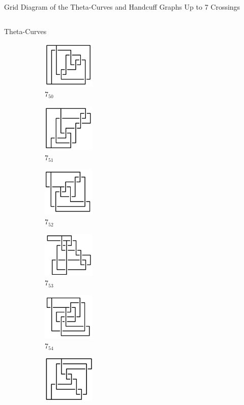 \documentclass[final]{beamer}
\begin{document}
\begin{frame}[t]
\begin{alertblock}{Grid Diagram of the Theta-Curves and Handcuff Graphs Up to 7 Crossings}
\begin{columns}[t]
\begin{column}{0.7\textwidth}
\begin{alertblock}{Theta-Curves}
\begin{figure}
\begin{subfigure}{0.075\textwidth}
    \includegraphics[width=2.5cm]{../Midterm_Poster/grid_diagram/theta_7_50.png}
    \caption{$7_{50}$} 
    \end{subfigure}
    \begin{subfigure}{0.075\textwidth}
    \includegraphics[width=2.5cm]{../Midterm_Poster/grid_diagram/theta_7_51.png}
    \caption{$7_{51}$} 
    \end{subfigure}
    \begin{subfigure}{0.075\textwidth}
    \includegraphics[width=2.5cm]{../Midterm_Poster/grid_diagram/theta_7_52.png}
    \caption{$7_{52}$} 
    \end{subfigure}
    \begin{subfigure}{0.075\textwidth}
    \includegraphics[width=2.5cm]{../Midterm_Poster/grid_diagram/theta_7_53.png}
    \caption{$7_{53}$} 
    \end{subfigure}
    \begin{subfigure}{0.075\textwidth}
    \includegraphics[width=2.5cm]{../Midterm_Poster/grid_diagram/theta_7_54.png}
    \caption{$7_{54}$} 
    \end{subfigure}
    \begin{subfigure}{0.075\textwidth}
    \includegraphics[width=2.5cm]{../Midterm_Poster/grid_diagram/theta_7_55.png}

\end{subfigure}
\end{figure}
\end{alertblock}
\end{column}
\end{columns}
\end{alertblock}
\end{frame}
\end{document}
